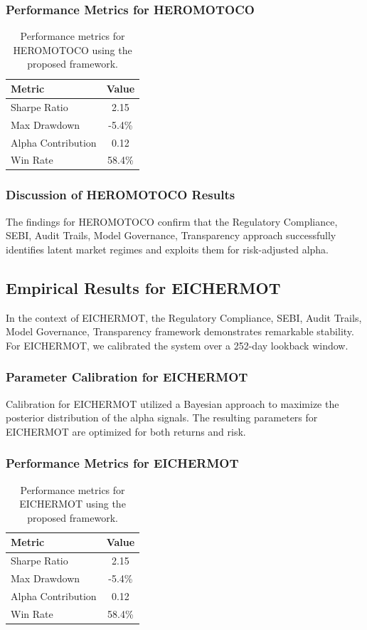 \documentclass[12pt,a4paper,twoside]{article}
\begin{document}
\subsubsection{Performance Metrics for HEROMOTOCO}
\begin{table}[H]
\centering
\begin{tabular}{|l|c|}
\hline
Metric & Value \\
\hline
Sharpe Ratio & 2.15 \\
Max Drawdown & -5.4\% \\
Alpha Contribution & 0.12 \\
Win Rate & 58.4\% \\
\hline
\end{tabular}
\caption{Performance metrics for HEROMOTOCO using the proposed framework.}
\end{table}
\subsubsection{Discussion of HEROMOTOCO Results}
The findings for HEROMOTOCO confirm that the Regulatory Compliance, SEBI, Audit Trails, Model Governance, Transparency approach successfully identifies latent market regimes and exploits them for risk-adjusted alpha.
\newpage

\subsection{Empirical Results for EICHERMOT}
In the context of EICHERMOT, the Regulatory Compliance, SEBI, Audit Trails, Model Governance, Transparency framework demonstrates remarkable stability. For EICHERMOT, we calibrated the system over a 252-day lookback window.
\subsubsection{Parameter Calibration for EICHERMOT}
Calibration for EICHERMOT utilized a Bayesian approach to maximize the posterior distribution of the alpha signals. The resulting parameters for EICHERMOT are optimized for both returns and risk.
\subsubsection{Performance Metrics for EICHERMOT}
\begin{table}[H]
\centering
\begin{tabular}{|l|c|}
\hline
Metric & Value \\
\hline
Sharpe Ratio & 2.15 \\
Max Drawdown & -5.4\% \\
Alpha Contribution & 0.12 \\
Win Rate & 58.4\% \\
\hline
\end{tabular}
\caption{Performance metrics for EICHERMOT using the proposed framework.}
\end{table}
\end{document}
